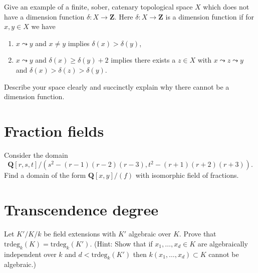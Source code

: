 \begin{exercise}
\label{exercise-example-no-dim-function}
Give an example of a finite, sober, catenary topological space
$X$ which does not have a dimension function $\delta : X \to \mathbf{Z}$.
Here $\delta : X \to \mathbf{Z}$ is a dimension function if
for $x, y \in X$ we have
\begin{enumerate}
\item $x \leadsto y$ and $x \not = y$ implies $\delta(x) > \delta(y)$,
\item $x \leadsto y$ and $\delta(x) \geq \delta(y) + 2$ implies
there exists a $z \in X$ with $x \leadsto z \leadsto y$ and
$\delta(x) > \delta(z) > \delta(y)$.
\end{enumerate}
Describe your space clearly and succinctly explain why there
cannot be a dimension function.
\end{exercise}




\section{Fraction fields}
\label{section-fraction-fields}

\begin{exercise}
\label{exercise-find-fraction-field}
Consider the domain
$$
{\mathbf Q}[r, s, t]/(s^2-(r-1)(r-2)(r-3), t^2-(r + 1)(r + 2)(r + 3)).
$$
Find a domain of the form ${\mathbf Q}[x, y]/(f)$ with isomorphic
field of fractions.
\end{exercise}



\section{Transcendence degree}
\label{section-transcendence}

\begin{exercise}
\label{exercise-algebraic-extension}
Let $K'/K/k$ be field extensions with $K'$
algebraic over $K$. Prove that $\text{trdeg}_k(K) = \text{trdeg}_k(K')$.
(Hint: Show that if $x_1, \ldots, x_d \in K$ are algebraically independent
over $k$ and $d < \text{trdeg}_k(K')$ then $k(x_1, \ldots, x_d) \subset K$
cannot be algebraic.)
\end{exercise}

